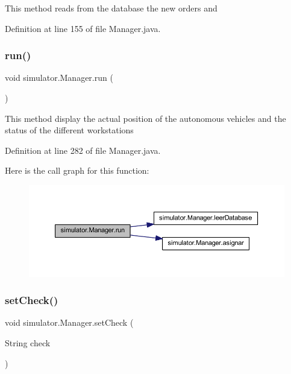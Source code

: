 This method reads from the database the new orders and 

Definition at line 155 of file Manager.\+java.

\mbox{\label{classsimulator_1_1_manager_ad98ac45d17514772c17a9c65be7d3892}} 
\subsubsection{\texorpdfstring{run()}{run()}}
{\footnotesize\ttfamily void simulator.\+Manager.\+run (\begin{DoxyParamCaption}{ }\end{DoxyParamCaption})}

This method display the actual position of the autonomous vehicles and the status of the different workstations 

Definition at line 282 of file Manager.\+java.

Here is the call graph for this function\+:\nopagebreak
\begin{figure}[H]
\begin{center}
\leavevmode
\includegraphics[width=350pt]{classsimulator_1_1_manager_ad98ac45d17514772c17a9c65be7d3892_cgraph}
\end{center}
\end{figure}
\mbox{\label{classsimulator_1_1_manager_aaaf1f38ecbe1e8d2ca7ad20081ab378a}} 
\subsubsection{\texorpdfstring{set\+Check()}{setCheck()}}
{\footnotesize\ttfamily void simulator.\+Manager.\+set\+Check (\begin{DoxyParamCaption}\item[{String}]{check }\end{DoxyParamCaption})}



